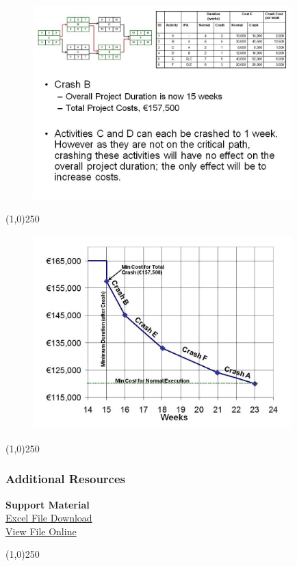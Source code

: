 \begin{frame}
\begin{figure}
	\centering
		\includegraphics[width = 10.0cm]{oldnotes/Slide360.jpg}
\end{figure}
\end{frame}
\begin{center}\line(1,0){250}\end{center}\begin{frame}


\begin{figure}
	\centering
		\includegraphics[width = 10.0cm]{oldnotes/Slide361.jpg}
\end{figure}
\end{frame}
\begin{center}\line(1,0){250}\end{center}



\begin{frame}
\frametitle{Additional Resources}
\textbf{Support Material}\\
\href{https://sites.google.com/site/paulveseyresourcefiles/project-management/Lecture_17_Excel_File.xlsx?attredirects=0&d=1}{Excel File Download}\\
\href{https://docs.google.com/viewer?a=v&pid=sites&srcid=ZGVmYXVsdGRvbWFpbnxwYXVsdmVzZXlyZXNvdXJjZWZpbGVzfGd4OjU0ZmY0NjJhZWMzMTZmNTE}{View File Online}
\end{frame}
\begin{center}\line(1,0){250}\end{center}





